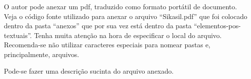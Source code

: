 \label{an:ex_anexo_b}

O autor pode anexar um pdf, traduzido como formato portátil de documento.
Veja o código fonte utilizado para anexar o arquivo ``Sikasil.pdf'' que foi
colocado dentro da pasta ``anexos'' que por sua vez está dentro da pasta
``elementos-pos-textuais''. Tenha muita atenção na hora de especificar o local
do arquivo. Recomenda-se não utilizar caracteres especiais para nomear pastas
    e, principalmente, arquivos.

Pode-se fazer uma descrição sucinta do arquivo anexado.



